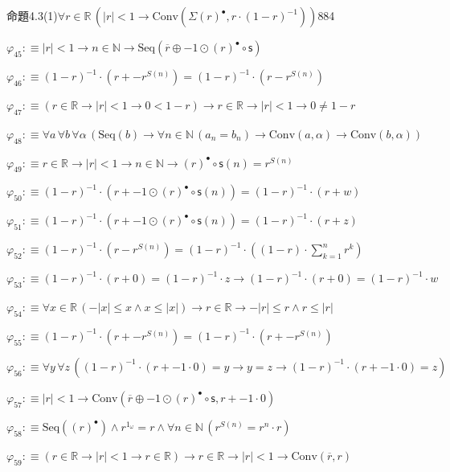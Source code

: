 \begin{fullproof}{命題4.3(1)}{$\forall r \in \mathbb{R}\,(\lvert r \rvert < 1 \to \mathrm{Conv}(\Sigma {(r)^{\bullet}},r \cdot (1 - r)^{-1}))$}{884}
\begin{abbrevlist}
\item $\varphi_{45} :\equiv \lvert r \rvert < 1 \to n \in \mathbb{N} \to \mathrm{Seq}(\overline{r} \oplus -1 \odot {(r)^{\bullet}} \circ \mathsf{s})$
\item $\varphi_{46} :\equiv (1 - r)^{-1} \cdot (r + -{{r}^{S(n)}}) = (1 - r)^{-1} \cdot (r - {{r}^{S(n)}})$
\item $\varphi_{47} :\equiv (r \in \mathbb{R} \to \lvert r \rvert < 1 \to 0 < 1 - r) \to r \in \mathbb{R} \to \lvert r \rvert < 1 \to 0 \neq 1 - r$
\item $\varphi_{48} :\equiv \forall a\,\forall b\,\forall \alpha\,(\mathrm{Seq}(b) \to \forall n \in \mathbb{N}\,(a_{n} = b_{n}) \to \mathrm{Conv}(a,\alpha) \to \mathrm{Conv}(b,\alpha))$
\item $\varphi_{49} :\equiv r \in \mathbb{R} \to \lvert r \rvert < 1 \to n \in \mathbb{N} \to {(r)^{\bullet}} \circ \mathsf{s}(n) = {{r}^{S(n)}}$
\item $\varphi_{50} :\equiv (1 - r)^{-1} \cdot (r + -1 \odot {(r)^{\bullet}} \circ \mathsf{s}(n)) = (1 - r)^{-1} \cdot (r + w)$
\item $\varphi_{51} :\equiv (1 - r)^{-1} \cdot (r + -1 \odot {(r)^{\bullet}} \circ \mathsf{s}(n)) = (1 - r)^{-1} \cdot (r + z)$
\item $\varphi_{52} :\equiv (1 - r)^{-1} \cdot (r - {{r}^{S(n)}}) = (1 - r)^{-1} \cdot ((1 - r) \cdot {\textstyle\sum_{k=1}^{n} {{r}^{k}}})$
\item $\varphi_{53} :\equiv (1 - r)^{-1} \cdot (r + 0) = (1 - r)^{-1} \cdot z \to (1 - r)^{-1} \cdot (r + 0) = (1 - r)^{-1} \cdot w$
\item $\varphi_{54} :\equiv \forall x \in \mathbb{R}\,(-\lvert x \rvert \leq x \land x \leq \lvert x \rvert) \to r \in \mathbb{R} \to -\lvert r \rvert \leq r \land r \leq \lvert r \rvert$
\item $\varphi_{55} :\equiv (1 - r)^{-1} \cdot (r + -{{r}^{S(n)}}) = (1 - r)^{-1} \cdot (r + -{{r}^{S(n)}})$
\item $\varphi_{56} :\equiv \forall y\,\forall z\,((1 - r)^{-1} \cdot (r + -1 \cdot 0) = y \to y = z \to (1 - r)^{-1} \cdot (r + -1 \cdot 0) = z)$
\item $\varphi_{57} :\equiv \lvert r \rvert < 1 \to \mathrm{Conv}(\overline{r} \oplus -1 \odot {(r)^{\bullet}} \circ \mathsf{s},r + -1 \cdot 0)$
\item $\varphi_{58} :\equiv \mathrm{Seq}({(r)^{\bullet}}) \land {{r}^{1_{\omega}}} = r \land \forall n \in \mathbb{N}\,({{r}^{S(n)}} = {{r}^{n}} \cdot r)$
\item $\varphi_{59} :\equiv (r \in \mathbb{R} \to \lvert r \rvert < 1 \to r \in \mathbb{R}) \to r \in \mathbb{R} \to \lvert r \rvert < 1 \to \mathrm{Conv}(\overline{r},r)$

\end{abbrevlist}
\end{fullproof}
